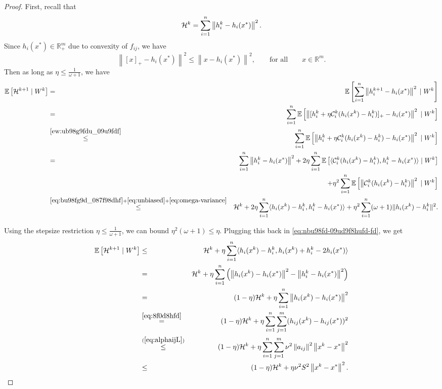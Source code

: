 \documentclass[10pt]{article}
\newcommand{\R}{\mathbb{R}}
\newcommand{\ExpBr}[1]{\mathbb{E}\left[#1\right]}
\newcommand{\norm}[1]{\left\|#1\right\|}
\newcommand{\cC}{{\mathcal{C}}}
\begin{document}
\begin{proof}
First, recall that
\begin{equation}\label{eq:bu98fg9d_087f98dhf}{\cal H}^{k} =   \sum_{i=1}^n \norm{h_i^{k} - h_i(x^*)}^2 .\end{equation}Since $h_{i}(x^*) \in \R^m_+$ due to convexity of $f_{ij}$, we have \begin{equation} \label{ew:ub98g9fdu_09u9fdf}\norm{[x]_+ - h_i(x^*)}^2 \leq \norm{x - h_i(x^*)}^2, \qquad \text{for all} \qquad x \in \R^m.\end{equation} Then as long as $\eta \leq \frac{1}{\omega+1}$, we have 
\begin{eqnarray}
\ExpBr{{\cal H}^{k+1} \;|\; W^k}	&=& \ExpBr{  \sum_{i=1}^n \norm{h_i^{k+1} - h_i(x^*)}^2  \;|\; W^k} \notag \\ 
	&=&  \sum_{i=1}^n\ExpBr{  \norm{ [h^k_i + \eta \cC_i^k(h_i(x^k) - h^k_i)]_+ - h_i(x^*) }^2  \;|\; W^k} \notag  \\ 
	&\overset{\eqref{ew:ub98g9fdu_09u9fdf}}{\leq} &    \sum_{i=1}^n \ExpBr{\norm{ h^k_i + \eta \cC_i^k(h_i(x^k) - h^k_i) - h_i(x^*) }^2 \;|\; W^k }\notag  \\ 
	&=& \sum_{i=1}^n  \norm{ h_i^k - h_i(x^*) }^2   + 2 \eta\sum_{i=1}^n \ExpBr{  \langle  \cC_i^k(h_i(x^k) - h_i^k),  h_i^k - h_i(x^*) \rangle \;|\; W^k}\notag  \\
	&& \qquad + \eta^2 \sum_{i=1}^n \ExpBr{ \norm{\cC_i^k(h_i(x^k) - h_i^k) }^2 \;|\; W^k} \notag \\ 
	&\overset{\eqref{eq:bu98fg9d_087f98dhf}+\eqref{eq:unbiased} + \eqref{eq:omega-variance}}{\leq} &  {\cal H}^k  + 2\eta \sum_{i=1}^n    \langle  h_i(x^k) - h_i^k, h_i^k - h_i(x^*) \rangle  + \eta^2 \sum_{i=1}^n  (\omega+1) \|h_i(x^k) - h_i^k\|^2 .\label{eq:nbu98fd-09ud9f8hufd-fd}
	\end{eqnarray}
	
Using the stepsize restriction $\eta \leq \frac{1}{\omega+1}$, we can bound $\eta^2 (\omega+1) \leq \eta$. Plugging this back in  \eqref{eq:nbu98fd-09ud9f8hufd-fd}, we get
\begin{eqnarray*}
\ExpBr{{\cal H}^{k+1} \;|\; W^k}
	&\leq &  {\cal H}^k  + \eta  \sum_{i=1}^n   \langle h_i(x^k) - h_i^k, h_i(x^k) + h_i^k - 2h_i(x^*) \rangle  \\ 
	&=&  {\cal H}^k  + \eta \sum_{i=1}^n  \left( \norm{h_i(x^k) - h_i(x^*)}^2 - \norm{h_i^k - h_i(x^*)}^2\right)   \\ 
	&=& (1-\eta) {\cal H}^k  + \eta \sum_{i=1}^n  \norm{h_i(x^k) - h_i(x^*)}^2  \\ 
		&\overset{\eqref{eq:8f0d8hfd}}{=} & (1-\eta) {\cal H}^k  + \eta \sum_{i=1}^n  \sum_{j=1}^m (h_{ij}(x^k) - h_{ij}(x^*))^2  \\ 
	&\overset{(\ref{eq:alphaijL})}{\leq}&  (1-\eta) {\cal H}^k + \eta\sum_{i=1}^n \sum_{j=1}^m \nu^2 \norm{a_{ij}}^2 \norm{x^k - x^*}^2 \\ 
	&\leq&  (1-\eta) {\cal H}^k +  \eta \nu^2 S^2 \norm{x^k - x^*}^2. 
\end{eqnarray*}

\end{proof}
\end{document}
